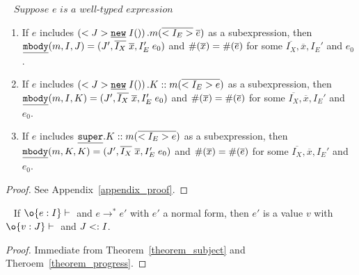 \begin{theorem}[Progress]~\label{theorem_progress}
$\textit{Suppose } e \textit{ is a well-typed expression } $ \\
\begin{enumerate}
\item If $e$ includes $\left(<J>\emph{\texttt{new}}\;I()\right).m(\overline{<I_E>} \; \overline{e})$ as a subexpression,
    then $ \emph{\texttt{mbody}}(m, I, J) = (J', \overline{I_X} \; \overline{x}, I'_E \; e_0) $ and
         $\#(\overline{x}) = \#(\overline{e})$ for some $\overline{I_X}, \overline{x}, I_E'$ and $e_0$.
\item If $e$ includes $\left(<J>\emph{\texttt{new}}\;I()\right).K::m(\overline{<I_E> e})$ as a subexpression,
    then $ \emph{\texttt{mbody}}(m, I, K) = (J', \overline{I_X} \; \overline{x}, I'_E \; e_0) $ and 
         $\#(\overline{x}) = \#(\overline{e})$ for some $\overline{I_X}, \overline{x}, I_E'$ and $e_0$.
\item If $e$ includes $\emph{\texttt{super}}.K::m(\overline{<I_E> e})$ as a subexpression,
    then $ \emph{\texttt{mbody}}(m, K, K) = (J', \overline{I_X} \; \overline{x}, I'_E \; e_0) $ and 
         $\#(\overline{x}) = \#(\overline{e})$ for some $\overline{I_X}, \overline{x}, I_E'$ and $e_0$.
\end{enumerate}
\end{theorem}
\begin{proof}
See Appendix~\ref{appendix_proof}.
\end{proof}

\begin{theorem}~\label{theorem_soundness}
If $\judgeewf \o {e : I}$ and $e \to^* e'$ with $e'$ a normal form, then $e'$ is 
a value $v$ with $\judgeewf \o {v:J}$ and $J <: I$.
\end{theorem}
\begin{proof}
Immediate from Theorem~\ref{theorem_subject} and Theroem~\ref{theorem_progress}.
\end{proof}

